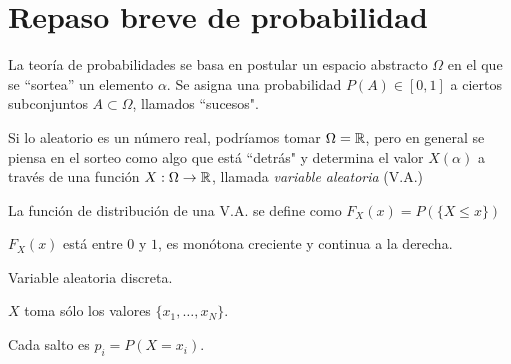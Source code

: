\section{Repaso breve de probabilidad}\label{app:probabilidad}

La teoría de probabilidades se basa en postular un espacio
abstracto $\Omega$ en el que se ``sortea'' un elemento $\alpha$.
Se asigna una probabilidad $P(A)\in [0,1]$ a ciertos subconjuntos
$A\subset\Omega$, llamados ``sucesos".

Si lo aleatorio es un número real, podríamos tomar $\Omega=\mathbb{R}$,
pero en general se piensa en el sorteo como algo que está
``detrás" y determina el valor $X(\alpha)$ a través de una función
$X:\Omega\rightarrow\mathbb{R}$, llamada {\em variable aleatoria} (V.A.)

\begin{minipage}{0.3\textwidth}La función de distribución de una V.A. se define como $F_X(x)=P\left(\{X\leq x\}\right)$\end{minipage}\hfill
\begin{minipage}{0.6\textwidth}
\end{minipage}

$F_X(x)$ está entre $0$ y $1$, es monótona creciente y continua a
la derecha.

\begin{ejemplo}
    \back
Variable aleatoria discreta.\\
    \begin{minipage}{0.3\textwidth}
        $X$ toma sólo los valores $\{x_1, \ldots, x_N\}$.
    \end{minipage}\hfill
    \begin{minipage}{0.6\textwidth}

    Cada salto es $p_i=P(X=x_i)$.
    \end{minipage}
\end{ejemplo}

